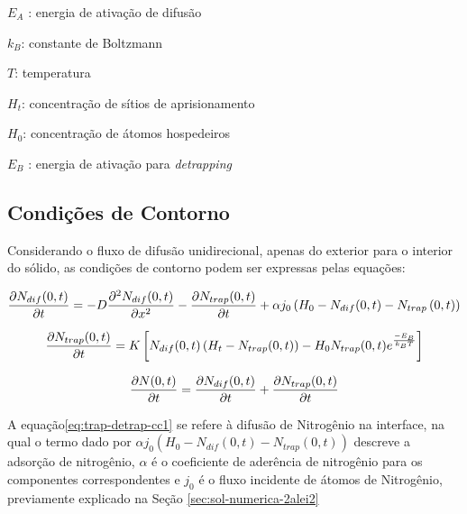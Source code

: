 $E_A$ : energia de ativação de difusão

$k_B$: constante de Boltzmann 
	
$T$: temperatura

$H_t$: concentração de sítios de aprisionamento

$H_0$: concentração de átomos hospedeiros
	
$E_B$ : energia de ativação para \textit{detrapping}


\subsection{Condições de Contorno}
\label{sec:trap-detrap-cc}

Considerando o fluxo de difusão unidirecional, apenas do exterior para o interior do sólido, as condições de contorno podem ser expressas pelas equações:

\begin{equation}
\label{eq:trap-detrap-cc1}
\pdv{N_{dif}(0,t)}{t} = -D\pdv[2]{N_{dif}(0,t)}{x} - \pdv{N_{trap}(0,t)}{t}  +\alpha j_{0}\left(H_0-N_{dif}(0,t)-N_{trap}\left(0,t\right)\right)
\end{equation}

\begin{equation}
\label{eq:trap-detrap-cc2}
\pdv{N_{trap}(0,t)}{t} = K\left[N_{dif}(0,t)\left(H_t-N_{trap}(0,t)\right) - H_0 N_{trap}(0,t)e^{\frac{-E_B}{k_BT}}\right] 
\end{equation}

\begin{equation}
\label{eq:trap-detrap-cc3}
\pdv{N(0,t)}{t} = \pdv{N_{dif}(0,t)}{t} + \pdv{N_{trap}(0,t)}{t}
\end{equation}

A equação\autoref{eq:trap-detrap-cc1} se refere à difusão de Nitrogênio na interface, na qual o termo dado por $\alpha j_{0}\left(H_0-N_{dif}(0,t)-N_{trap}\left(0,t\right)\right)$ descreve a adsorção de nitrogênio, $\alpha$ é o coeficiente de aderência de nitrogênio para os componentes correspondentes  e  $j_0$ é o fluxo incidente de átomos de Nitrogênio, previamente explicado na Seção \autoref{sec:sol-numerica-2alei2}
